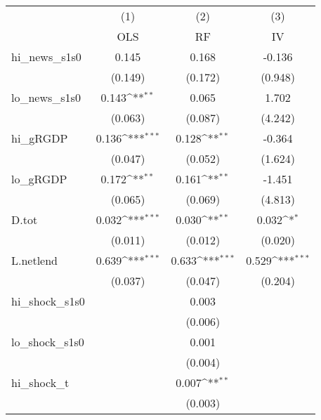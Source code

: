 {
\def\sym#1{\ifmmode^{#1}\else\(^{#1}\)\fi}
\begin{tabular}{l*{3}{c}}
\toprule
            &\multicolumn{1}{c}{(1)}&\multicolumn{1}{c}{(2)}&\multicolumn{1}{c}{(3)}\\
            &\multicolumn{1}{c}{OLS}&\multicolumn{1}{c}{RF}&\multicolumn{1}{c}{IV}\\
\midrule
hi\_news\_s1s0&       0.145         &       0.168         &      -0.136         \\
            &     (0.149)         &     (0.172)         &     (0.948)         \\
\addlinespace
lo\_news\_s1s0&       0.143\sym{**} &       0.065         &       1.702         \\
            &     (0.063)         &     (0.087)         &     (4.242)         \\
\addlinespace
hi\_gRGDP    &       0.136\sym{***}&       0.128\sym{**} &      -0.364         \\
            &     (0.047)         &     (0.052)         &     (1.624)         \\
\addlinespace
lo\_gRGDP    &       0.172\sym{**} &       0.161\sym{**} &      -1.451         \\
            &     (0.065)         &     (0.069)         &     (4.813)         \\
\addlinespace
D.tot       &       0.032\sym{***}&       0.030\sym{**} &       0.032\sym{*}  \\
            &     (0.011)         &     (0.012)         &     (0.020)         \\
\addlinespace
L.netlend   &       0.639\sym{***}&       0.633\sym{***}&       0.529\sym{***}\\
            &     (0.037)         &     (0.047)         &     (0.204)         \\
\addlinespace
hi\_shock\_s1s0&                     &       0.003         &                     \\
            &                     &     (0.006)         &                     \\
\addlinespace
lo\_shock\_s1s0&                     &       0.001         &                     \\
            &                     &     (0.004)         &                     \\
\addlinespace
hi\_shock\_t  &                     &       0.007\sym{**} &                     \\
            &                     &     (0.003)         &                     \\

\end{tabular}}
